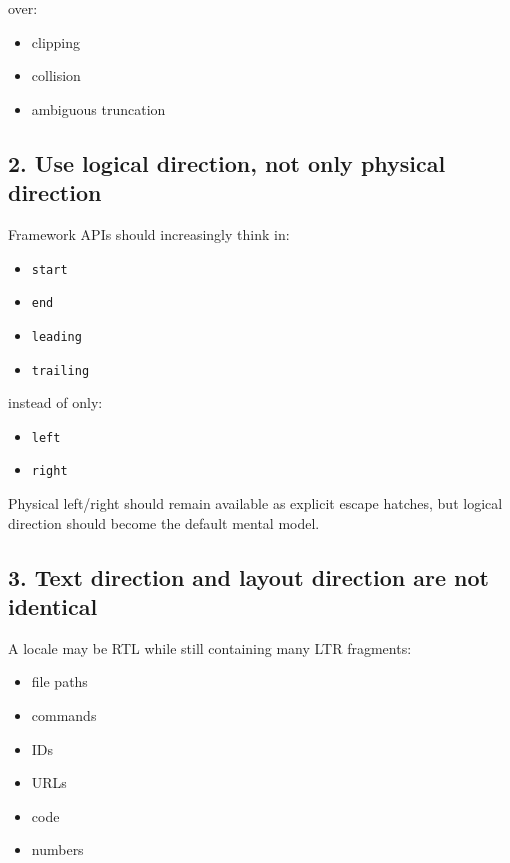 over:

\begin{itemize}
\tightlist
\item
  clipping
\item
  collision
\item
  ambiguous truncation
\end{itemize}

\subsection{2. Use logical direction, not only physical direction}\label{record-051-use-logical-direction-not-only-physical-direction}

Framework APIs should increasingly think in:

\begin{itemize}
\tightlist
\item
  \texttt{s\allowbreak{}t\allowbreak{}a\allowbreak{}r\allowbreak{}t}
\item
  \texttt{e\allowbreak{}n\allowbreak{}d}
\item
  \texttt{l\allowbreak{}e\allowbreak{}a\allowbreak{}d\allowbreak{}i\allowbreak{}n\allowbreak{}g}
\item
  \texttt{t\allowbreak{}r\allowbreak{}a\allowbreak{}i\allowbreak{}l\allowbreak{}i\allowbreak{}n\allowbreak{}g}
\end{itemize}

instead of only:

\begin{itemize}
\tightlist
\item
  \texttt{l\allowbreak{}e\allowbreak{}f\allowbreak{}t}
\item
  \texttt{r\allowbreak{}i\allowbreak{}g\allowbreak{}h\allowbreak{}t}
\end{itemize}

Physical left/right should remain available as explicit escape hatches, but logical direction should become the default mental model.

\subsection{3. Text direction and layout direction are not identical}\label{record-051-text-direction-and-layout-direction-are-not-identical}

A locale may be RTL while still containing many LTR fragments:

\begin{itemize}
\tightlist
\item
  file paths
\item
  commands
\item
  IDs
\item
  URLs
\item
  code
\item
  numbers
\end{itemize}

